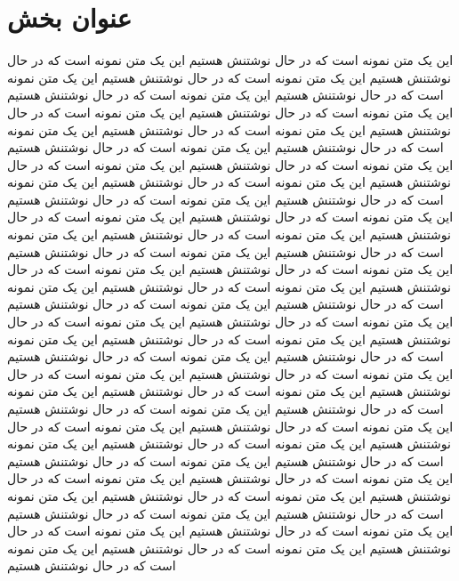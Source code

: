 \chapter{عنوان بخش}
این یک متن نمونه است که در حال نوشتنش هستیم  این یک متن نمونه است که در حال نوشتنش هستیم این یک متن نمونه است که در حال نوشتنش هستیم این یک متن نمونه است که در حال نوشتنش هستیم این یک متن نمونه است که در حال نوشتنش هستیم این یک متن نمونه است که در حال نوشتنش هستیم این یک متن نمونه است که در حال نوشتنش هستیم
این یک متن نمونه است که در حال نوشتنش هستیم  این یک متن نمونه است که در حال نوشتنش هستیم این یک متن نمونه است که در حال نوشتنش هستیم این یک متن نمونه است که در حال نوشتنش هستیم این یک متن نمونه است که در حال نوشتنش هستیم این یک متن نمونه است که در حال نوشتنش هستیم این یک متن نمونه است که در حال نوشتنش هستیم
این یک متن نمونه است که در حال نوشتنش هستیم  این یک متن نمونه است که در حال نوشتنش هستیم این یک متن نمونه است که در حال نوشتنش هستیم این یک متن نمونه است که در حال نوشتنش هستیم این یک متن نمونه است که در حال نوشتنش هستیم این یک متن نمونه است که در حال نوشتنش هستیم این یک متن نمونه است که در حال نوشتنش هستیم
این یک متن نمونه است که در حال نوشتنش هستیم  این یک متن نمونه است که در حال نوشتنش هستیم این یک متن نمونه است که در حال نوشتنش هستیم این یک متن نمونه است که در حال نوشتنش هستیم این یک متن نمونه است که در حال نوشتنش هستیم این یک متن نمونه است که در حال نوشتنش هستیم این یک متن نمونه است که در حال نوشتنش هستیم
این یک متن نمونه است که در حال نوشتنش هستیم  این یک متن نمونه است که در حال نوشتنش هستیم این یک متن نمونه است که در حال نوشتنش هستیم این یک متن نمونه است که در حال نوشتنش هستیم این یک متن نمونه است که در حال نوشتنش هستیم این یک متن نمونه است که در حال نوشتنش هستیم این یک متن نمونه است که در حال نوشتنش هستیم
این یک متن نمونه است که در حال نوشتنش هستیم  این یک متن نمونه است که در حال نوشتنش هستیم این یک متن نمونه است که در حال نوشتنش هستیم این یک متن نمونه است که در حال نوشتنش هستیم این یک متن نمونه است که در حال نوشتنش هستیم این یک متن نمونه است که در حال نوشتنش هستیم این یک متن نمونه است که در حال نوشتنش هستیم
این یک متن نمونه است که در حال نوشتنش هستیم  این یک متن نمونه است که در حال نوشتنش هستیم این یک متن نمونه است که در حال نوشتنش هستیم این یک متن نمونه است که در حال نوشتنش هستیم این یک متن نمونه است که در حال نوشتنش هستیم این یک متن نمونه است که در حال نوشتنش هستیم این یک متن نمونه است که در حال نوشتنش هستیم

